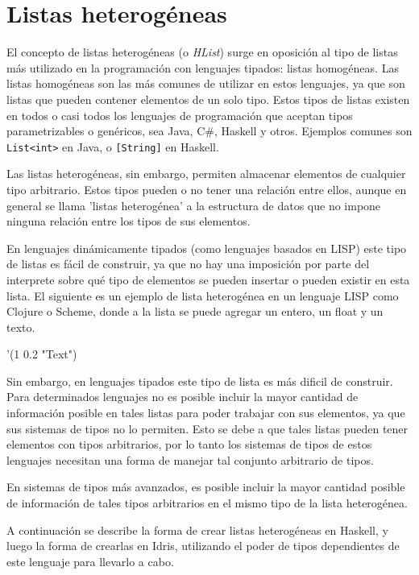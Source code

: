 \section{Listas heterogéneas}

El concepto de listas heterogéneas (o \textit{HList}) surge en oposición al tipo de listas más utilizado en la programación con lenguajes tipados: listas homogéneas. Las listas homogéneas son las más comunes de utilizar en estos lenguajes, ya que son listas que pueden contener elementos de un solo tipo.
Estos tipos de listas existen en todos o casi todos los lenguajes de programación que aceptan tipos parametrizables o genéricos, sea Java, C\#, Haskell y otros. Ejemplos comunes son \texttt{List<int>} en Java, o \texttt{[String]} en Haskell.

Las listas heterogéneas, sin embargo, permiten almacenar elementos de cualquier tipo arbitrario. Estos tipos pueden o no tener una relación entre ellos, aunque en general se llama 'listas heterogénea' a la estructura de datos que no impone ninguna relación entre los tipos de sus elementos.

En lenguajes dinámicamente tipados (como lenguajes basados en LISP) este tipo de listas es fácil de construir, ya que no hay una imposición por parte del interprete sobre qué tipo de elementos se pueden insertar o pueden existir en esta lista. El siguiente es un ejemplo de lista heterogénea en un lenguaje LISP como Clojure o Scheme, donde a la lista se puede agregar un entero, un float y un texto.

\begin{code}
'(1 0.2 "Text")
\end{code}

Sin embargo, en lenguajes tipados este tipo de lista es más dificil de construir. Para determinados lenguajes no es posible incluir la mayor cantidad de información posible en tales listas para poder trabajar con sus elementos, ya que sus sistemas de tipos no lo permiten. Esto se debe a que tales listas pueden tener elementos con tipos arbitrarios, por lo tanto los sistemas de tipos de estos lenguajes necesitan una forma de manejar tal conjunto arbitrario de tipos.

En sistemas de tipos más avanzados, es posible incluir la mayor cantidad posible de información de tales tipos arbitrarios en el mismo tipo de la lista heterogénea. 

A continuación se describe la forma de crear listas heterogéneas en Haskell, y luego la forma de crearlas en Idris, utilizando el poder de tipos dependientes de este lenguaje para llevarlo a cabo.

